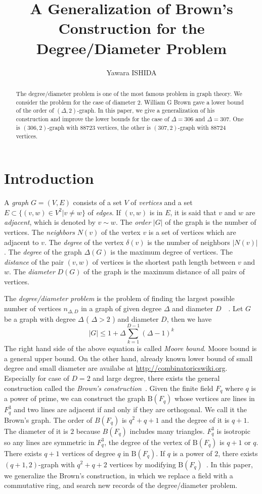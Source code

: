 \documentclass{article}
\title{A Generalization of Brown's Construction for the Degree/Diameter Problem}
\author{Yawara ISHIDA}
\newcommand{\B}{\mathrm{B}}
\begin{document}
\maketitle
\begin{abstract}
The degree/diameter problem is one of the most famous problem in graph theory. 
We consider the problem for the case of diameter 2.
William G Brown gave a lower bound of the order of $(\Delta,2)$-graph.
In this paper, we give a generalization of his construction and improve the lower bounds for the case of $\Delta=306$ and $\Delta=307$.
One is $(306,2)$-graph with $88723$ vertices, the other is $(307,2)$-graph with $88724$ vertices.
\end{abstract}

\section{Introduction}
A {\it graph} $G=(V,E)$ consists of a set $V$ of {\it vertices} and a set $E \subset \{(v,w) \in V^2 | v \neq w \}$ of {\it edges}.
If $(v,w)$ is in $E$, it is said that $v$ and $w$ are {\it adjacent}, which is denoted by $v \sim w$.
The {\it order} $|G|$ of the graph is the number of vertices. 
The {\it neighbors} $N(v)$ of the vertex $v$ is a set of vertices which are adjacent to $v$.
The {\it degree} of the vertex $\delta(v)$ is the number of neighbors $| N(v) |$.  
The {\it degree} of the graph $\Delta(G)$ is the maximum degree of vertices.
The {\it distance} of the pair $(v,w)$ of vertices is the shortest path length between $v$ and $w$. 
The {\it diameter} $D(G)$ of the graph is the  maximum distance of all pairs of vertices.

The {\it degree/diameter problem} is the problem of finding the largest possible number of vertices $n_{\Delta,D}$ in a graph of given degree $\Delta$ and diameter $D$~\cite{MilSir2005}~\cite{brown1966graphs}. 
Let $G$ be a graph with degree $\Delta$ ( $\Delta > 2$ ) and diameter $D$, then we have 
\[ |G| \leq 1 + \Delta \sum_{k=1}^{D-1} (\Delta - 1)^k\]
The right hand side of the above equation is called {\it Moore bound}.
Moore bound is a general upper bound. 
On the other hand, already known lower bound of small degree and small diameter are availabe at \url{http://combinatoricswiki.org}. 
Especially for case of $D=2$ and large degree, there exists the general construction called the {\it Brown's construction}~\cite{MilSir2005}.
Given the finite field $F_q$ where $q$ is a power of prime, we can construct the graph $\B(F_q)$ whose vertices are lines in $F_q^3$ and two lines are adjacent if and only if they are orthogonal. 
We call it the Brown's graph.
The order of $B(F_q)$ is $q^2+q+1$ and the degree of it is $q+1$. The diameter of it is $2$ because $B(F_q)$ includes many triangles. 
$F_q^3$ is isotropic so any lines are symmetric in $F_q^3$, the degree of the vertex of $\B(F_q)$ is $q+1$ or $q$. 
There exists $q+1$ vertices of degree $q$ in $\B(F_q)$.
If $q$ is a power of $2$, there exists $(q+1,2)$-graph with $q^2+q+2$ vertices by modifying $\B(F_q)$~\cite{journals/networks/ErdosFH80}.
In this paper, we generalize the Brown's construction, in which we replace a field with a commutative ring, and search new records of the degree/diameter problem.
\end{document}
